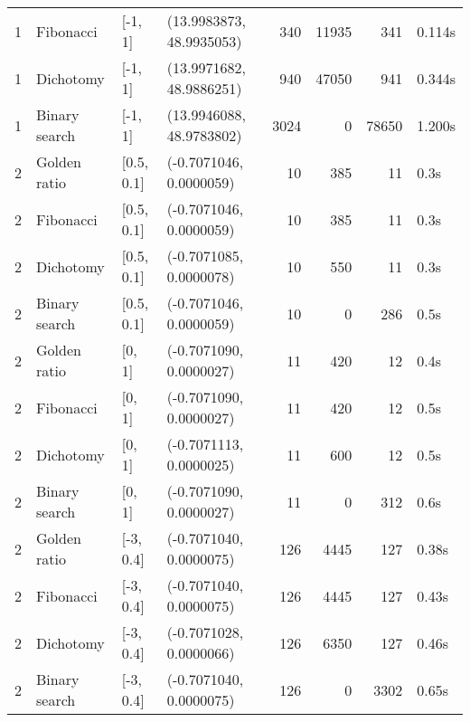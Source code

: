 \documentclass{article}
\begin{document}
\begin{tabular}{rlllrrrl}
        1 &      Fibonacci &     [-1, 1] &  (13.9983873, 48.9935053) &         340 &           11935 &             341 &       0.114s \\
        1 &      Dichotomy &     [-1, 1] &  (13.9971682, 48.9886251) &         940 &           47050 &             941 &       0.344s \\
        1 &  Binary search &     [-1, 1] &  (13.9946088, 48.9783802) &        3024 &               0 &           78650 &       1.200s \\
        2 &   Golden ratio &  [0.5, 0.1] &   (-0.7071046, 0.0000059) &          10 &             385 &              11 &         0.3s \\
        2 &      Fibonacci &  [0.5, 0.1] &   (-0.7071046, 0.0000059) &          10 &             385 &              11 &         0.3s \\
        2 &      Dichotomy &  [0.5, 0.1] &   (-0.7071085, 0.0000078) &          10 &             550 &              11 &         0.3s \\
        2 &  Binary search &  [0.5, 0.1] &   (-0.7071046, 0.0000059) &          10 &               0 &             286 &         0.5s \\
        2 &   Golden ratio &      [0, 1] &   (-0.7071090, 0.0000027) &          11 &             420 &              12 &         0.4s \\
        2 &      Fibonacci &      [0, 1] &   (-0.7071090, 0.0000027) &          11 &             420 &              12 &         0.5s \\
        2 &      Dichotomy &      [0, 1] &   (-0.7071113, 0.0000025) &          11 &             600 &              12 &         0.5s \\
        2 &  Binary search &      [0, 1] &   (-0.7071090, 0.0000027) &          11 &               0 &             312 &         0.6s \\
        2 &   Golden ratio &   [-3, 0.4] &   (-0.7071040, 0.0000075) &         126 &            4445 &             127 &        0.38s \\
        2 &      Fibonacci &   [-3, 0.4] &   (-0.7071040, 0.0000075) &         126 &            4445 &             127 &        0.43s \\
        2 &      Dichotomy &   [-3, 0.4] &   (-0.7071028, 0.0000066) &         126 &            6350 &             127 &        0.46s \\
        2 &  Binary search &   [-3, 0.4] &   (-0.7071040, 0.0000075) &         126 &               0 &            3302 &        0.65s \\

\end{tabular}
\end{document}
